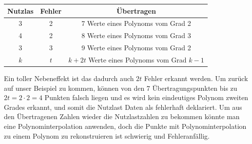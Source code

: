 \begin{center}
    \begin{tabular}{ c c c } 
        \hline
        Nutzlas & Fehler & Übertragen \\
        \hline 
        3 & 2 & 7 Werte eines Polynoms vom Grad 2 \\ 
        4 & 2 & 8 Werte eines Polynoms vom Grad 3 \\
        3 & 3 & 9 Werte eines Polynoms vom Grad 2 \\ 
        \hline
        $k$ & $t$ & $k+2t$ Werte eines Polynoms vom Grad $k-1$ \\ 
        \hline
    \end{tabular}
\end{center}

Ein toller Nebeneffekt ist das dadurch auch $2t$ Fehler erkannt werden. 
Um zurück auf unser Beispiel zu kommen, 
können von den 7 Übertragungspunkten bis zu $2t = 2\cdot2 = 4 $ Punkten falsch liegen 
und es wird kein eindeutiges Polynom zweiten Grades erkannt, und somit die Nutzlast Daten als fehlerhaft deklariert.
Um aus den Übertragenen Zahlen wieder die Nutzlastzahlen zu bekommen könnte man eine Polynominterpolation anwenden,
doch die Punkte mit Polynominterpolation zu einem Polynom zu rekonstruieren ist schwierig und Fehleranfällig.

